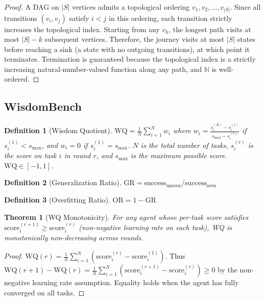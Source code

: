 \documentclass[11pt,a4paper]{article}
\newtheorem{theorem}{Theorem}
\newtheorem{definition}{Definition}
\begin{document}
\begin{proof}
A DAG on $|S|$ vertices admits a topological ordering
$v_1, v_2, \ldots, v_{|S|}$.
Since all transitions $(v_i, v_j)$ satisfy $i < j$ in this ordering,
each transition strictly increases the topological index. Starting from
any $v_k$, the longest path visits at most $|S| - k$ subsequent vertices.
Therefore, the journey visits at most $|S|$ states before reaching a
sink (a state with no outgoing transitions), at which point it terminates.
Termination is guaranteed because the topological index is a strictly
increasing natural-number-valued function along any path, and $\mathbb{N}$
is well-ordered.
\end{proof}

\subsection{WisdomBench}

\begin{definition}[Wisdom Quotient]
\label{def:wq}
$\text{WQ} = \frac{1}{N} \sum_{i=1}^{N} w_i$
where $w_i = \frac{s_i^{(R)} - s_i^{(1)}}{s_{\max} - s_i^{(1)}}$
if $s_i^{(1)} < s_{\max}$, and $w_i = 0$ if $s_i^{(1)} = s_{\max}$.
$N$ is the total number of tasks, $s_i^{(r)}$
is the score on task $i$ in round $r$, and $s_{\max}$ is the maximum
possible score. $\text{WQ} \in [-1, 1]$.
\end{definition}

\begin{definition}[Generalization Ratio]
$\text{GR} = \text{success}_{\text{unseen}} / \text{success}_{\text{seen}}$
\end{definition}

\begin{definition}[Overfitting Ratio]
$\text{OR} = 1 - \text{GR}$
\end{definition}

\begin{theorem}[WQ Monotonicity]
\label{thm:wq_mono}
For any agent whose per-task score satisfies $\text{score}_i^{(r+1)} \geq
\text{score}_i^{(r)}$ (non-negative learning rate on each task), WQ is
monotonically non-decreasing across rounds.
\end{theorem}

\begin{proof}
$\text{WQ}(r) = \frac{1}{N} \sum_{i=1}^{N} (\text{score}_i^{(r)} -
\text{score}_i^{(1)})$.
Thus $\text{WQ}(r+1) - \text{WQ}(r) = \frac{1}{N} \sum_{i=1}^{N}
(\text{score}_i^{(r+1)} - \text{score}_i^{(r)}) \geq 0$
by the non-negative learning rate assumption.
Equality holds when the agent has fully converged on all tasks.
\end{proof}
\end{document}
